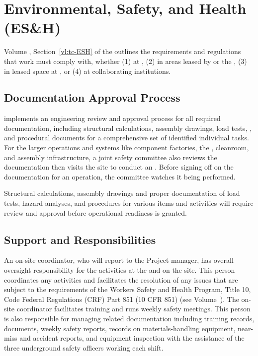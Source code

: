 \section{Environmental, Safety, and Health (ES\&H)}
\label{sec:fdsp-tc-safety}

 Volume \volnumbertc{}, Section~\ref{vl:tc-ESH} of the   outlines the requirements and regulations that  work must comply with, whether (1) at , (2) in areas  leased by  or the , (3) in leased space at , or (4) at collaborating institutions.
 
\subsection{Documentation Approval Process}


 implements an engineering review and approval process for all required documentation, including structural calculations, assembly drawings, load tests, , and procedural documents for a comprehensive set of identified individual tasks.  For the larger operations and systems like  component factories, the , cleanroom, and assembly infrastructure, a joint safety committee also reviews the documentation then visits the site to conduct
 an . Before signing off on the documentation for an operation, the committee watches it being performed. 
 
 Structural calculations, assembly drawings and proper documentation of  load tests, hazard analyses, and procedures for various items and activities will require review and approval before operational readiness is granted. 

 
\subsection{Support and Responsibilities}

An on-site  coordinator, who will report to the  Project  manager, has overall  oversight responsibility for the  activities at the   and on the  site. 
This person coordinates any  activities and facilitates the resolution of any issues that are subject to the requirements of the  Workers Safety and Health Program, Title 10, Code Federal Regulations (CRF) Part 851 (10 CFR 851) (see Volume~\volnumbertc{}).  The on-site  coordinator facilitates training and runs weekly safety meetings. This  person is also responsible for managing  related  documentation including training records,  documents, weekly safety reports, records on materials-handling equipment, near-miss and accident reports, and equipment inspection with the assistance of the three  underground safety officers working each shift. 

